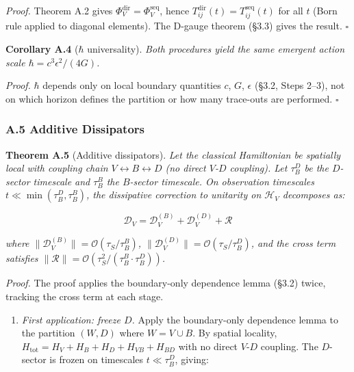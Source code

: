 \documentclass[
]{article}
\providecommand{\tightlist}{%
  \setlength{\itemsep}{0pt}\setlength{\parskip}{0pt}}
\begin{document}
\emph{Proof.} Theorem A.2 gives
\(\Phi_V^{\text{dir}} = \Phi_V^{\text{seq}}\), hence
\(T^{\text{dir}}_{ij}(t) = T^{\text{seq}}_{ij}(t)\) for all \(t\) (Born
rule applied to diagonal elements). The D-gauge theorem (§3.3) gives the
result. \(\square\)

\textbf{Corollary A.4} (\(\hbar\) universality). \emph{Both procedures
yield the same emergent action scale \(\hbar = c^3 \epsilon^2 / (4G)\).}

\emph{Proof.} \(\hbar\) depends only on local boundary quantities \(c\),
\(G\), \(\epsilon\) (§3.2, Steps 2--3), not on which horizon defines the
partition or how many trace-outs are performed. \(\square\)

\hypertarget{a.5-additive-dissipators}{%
\subsubsection{A.5 Additive
Dissipators}\label{a.5-additive-dissipators}}

\textbf{Theorem A.5} (Additive dissipators). \emph{Let the classical
Hamiltonian be spatially local with coupling chain
\(V \leftrightarrow B \leftrightarrow D\) (no direct \(V\)-\(D\)
coupling). Let \(\tau_B^D\) be the \(D\)-sector timescale and
\(\tau_B^B\) the \(B\)-sector timescale. On observation timescales
\(t \ll \min(\tau_B^D, \tau_B^B)\), the dissipative correction to
unitarity on \(\mathcal{H}_V\) decomposes as:}

\[\mathcal{D}_V = \mathcal{D}_V^{(B)} + \mathcal{D}_V^{(D)} + \mathcal{R}\]

\emph{where
\(\|\mathcal{D}_V^{(B)}\| = \mathcal{O}(\tau_S / \tau_B^B)\),
\(\|\mathcal{D}_V^{(D)}\| = \mathcal{O}(\tau_S / \tau_B^D)\), and the
cross term satisfies
\(\|\mathcal{R}\| = \mathcal{O}(\tau_S^2 / (\tau_B^B \cdot \tau_B^D))\).}

\emph{Proof.} The proof applies the boundary-only dependence lemma
(§3.2) twice, tracking the cross term at each stage.

\begin{enumerate}
\def\labelenumi{(\roman{enumi})}
\tightlist
\item
  \emph{First application: freeze \(D\).} Apply the boundary-only
  dependence lemma to the partition \((W, D)\) where \(W = V \cup B\).
  By spatial locality,
  \(H_{\text{tot}} = H_V + H_B + H_D + H_{VB} + H_{BD}\) with no direct
  \(V\)-\(D\) coupling. The \(D\)-sector is frozen on timescales
  \(t \ll \tau_B^D\), giving:
\end{enumerate}
\end{document}
